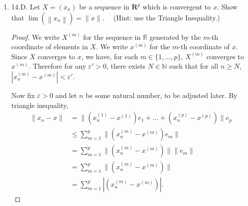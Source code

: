 \begin{enumerate}
\begin{proof}
	We can conclude that every point $(0,y)$ such that $y \in [0,1]$ is a cluster point of $S_1$, since for any neighborhood ball $B_\varepsilon(0,y)$ containing $(0,y)$, it contains at least one point from $S_1$ by previous claim, and contains $(0,y')$ whenever $|y'-y|<\varepsilon$ which are infinitely many number of intersection with $S_1^c$.
	
	By the last exercise,  $\overline{S_1} = S_1 \cup S_3$ is connected. Symmetrically, $\overline{S_2}  = S_2 \cup S_3$ is connected. Hence $S = S_1 \cup S_2 \cup S_3$ is connected by the lemma.

	Consider $s_1 = (0, 1)$ and $s_2 = (1, \sin 1)$. For a curve $\gamma: [0,1] \to [-1, 1]$ such that $\gamma(0) = s_1$ and $\gamma(1) = s_2$ to be entirely in $S$, it has to coincide with $f$ in $S_1$, and take value $s_1$ in $S_3$. But the right limit of $\gamma$ at $0$ does not exist, since $f$ does not have a right limit at $0$. Therefore $\gamma$ cannot be continuous at $0$. In other words, there does not exist a continuous curve $\gamma$ joining $s_1$ and $s_2$.
\end{proof}


\item 14.D. Let $X=\left(x_n\right)$ be a sequence in $\boldsymbol{R}^p$ which is convergent to $x$. Show that $\lim \left(\left\|x_n\right\|\right)=\|x\| . \quad$ (Hint: use the Triangle Inequality.)
\begin{proof}
	We write $X^{(m)}$ for the sequence in $\mathbb{R}$ generated by the $m$-th coordinate of elements in  $X$. We write $x^{(m)}$ for the $m$-th coordinate of $x$.
	Since $X$ converges to $x$, we have, for each $m \in \{1, \ldots, p\} $, $X^{(m)}$ converges to $x^{(m)}$. Therefore for any $\varepsilon'>0$, there exists $N \in \mathbb{N}$ such that for all $n \ge N$, $|x_n^{(m)} - x^{(m)}| < \varepsilon'$.

	Now fix $\varepsilon>0$ and let $n$ be some natural number, to be adjusted later. By triangle inequality,
	\begin{align*}
		\|x_n - x\|
		&= \|\left( x_n^{(1)}-x^{(1)} \right) e_1 + \ldots + \left( x_n^{(p)} - x^{(p)} \right) \|e_p \\
		&\le \sum_{m=1}^{p} \|\left( x_n^{(m)} - x^{(m)} \right) e_m\|\\
		&= \sum_{m=1}^{p} \|\left( x_n^{(m)} - x^{(m)} \right)\| \|e_m\|\\
		&= \sum_{m=1}^{p} \|\left( x_n^{(m)} - x^{(m)} \right)\|\\
		&= \sum_{m=1}^{p} |\left( x_n^{(m)} - x^{(m)} \right)|
	.\end{align*}


\end{proof}
\end{enumerate}
